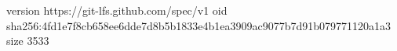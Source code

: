 version https://git-lfs.github.com/spec/v1
oid sha256:4fd1e7f8cb658ee6dde7d8b5b1833e4b1ea3909ac9077b7d91b079771120a1a3
size 3533
